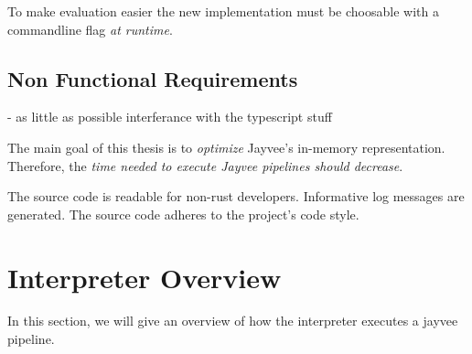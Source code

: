 To make evaluation easier the new implementation must be choosable with a commandline flag \emph{at runtime}.

\subsection{Non Functional Requirements}
\label{subsection:NonFunctionalRequirements}

- as little as possible interferance with the typescript stuff

The main goal of this thesis is to \emph{optimize} Jayvee's in-memory representation.
Therefore, the \emph{time needed to execute Jayvee pipelines should decrease}.

The source code is readable for non-rust developers.
Informative log messages are generated.
The source code adheres to the project's code style.

\section{Interpreter Overview}
\label{section:prev}

In this section, we will give an overview of how the interpreter executes a jayvee pipeline.

